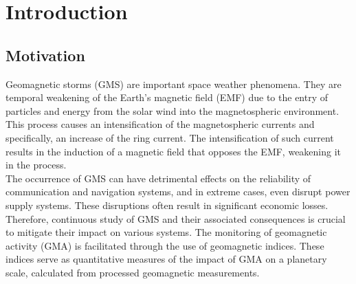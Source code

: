 \documentclass[12pt]{article}
\begin{document}
\section{Introduction}
\label{S:1}

\subsection{Motivation}
Geomagnetic storms (GMS) are important space weather phenomena. They are temporal weakening of the Earth's magnetic field (EMF) due to the entry of particles and energy from the solar wind into the magnetospheric environment. This process causes an intensification of the magnetospheric currents and specifically, an increase of the ring current. The intensification of such current results in the induction of a magnetic field that opposes the EMF, weakening it in the process.\\

The occurrence of GMS can have detrimental effects on the reliability of communication and navigation systems, and in extreme cases, even disrupt power supply systems. These disruptions often result in significant economic losses. Therefore, continuous study of GMS and their associated consequences is crucial to mitigate their impact on various systems. The monitoring of geomagnetic activity (GMA) is facilitated through the use of geomagnetic indices. These indices serve as quantitative measures of the impact of GMA on a planetary scale, calculated from processed geomagnetic measurements.\\
\end{document}
